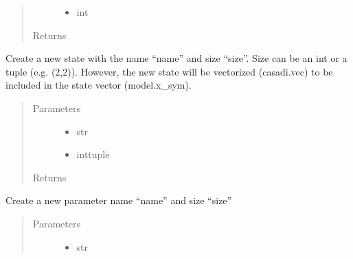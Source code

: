 \documentclass[letterpaper,10pt,english]{sphinxmanual}
\begin{document}
\begin{fulllineitems}
\begin{fulllineitems}
\begin{quote}
\begin{description}
\begin{itemize}
\item {} 
 \textendash{} int

\end{itemize}

\item[{Returns}] \leavevmode


\end{description}\end{quote}

\end{fulllineitems}


\begin{fulllineitems}
\label{\detokenize{yaocptool.modelling:yaocptool.modelling.system_model.SystemModel.create_state}}
Create a new state with the name “name” and size “size”.
Size can be an int or a tuple (e.g. (2,2)). However, the new state will be vectorized (casadi.vec) to be
included in the state vector (model.x\_sym).
\begin{quote}\begin{description}
\item[{Parameters}] \leavevmode\begin{itemize}
\item {} 
 \textendash{} str

\item {} 
 \textendash{} int\textbar{}tuple

\end{itemize}

\item[{Returns}] \leavevmode


\end{description}\end{quote}

\end{fulllineitems}


\begin{fulllineitems}
\label{\detokenize{yaocptool.modelling:yaocptool.modelling.system_model.SystemModel.create_theta}}
Create a new parameter name “name” and size “size”
\begin{quote}\begin{description}
\item[{Parameters}] \leavevmode\begin{itemize}
\item {} 
 \textendash{} str


\end{itemize}
\end{description}
\end{quote}
\end{fulllineitems}
\end{fulllineitems}
\end{document}
